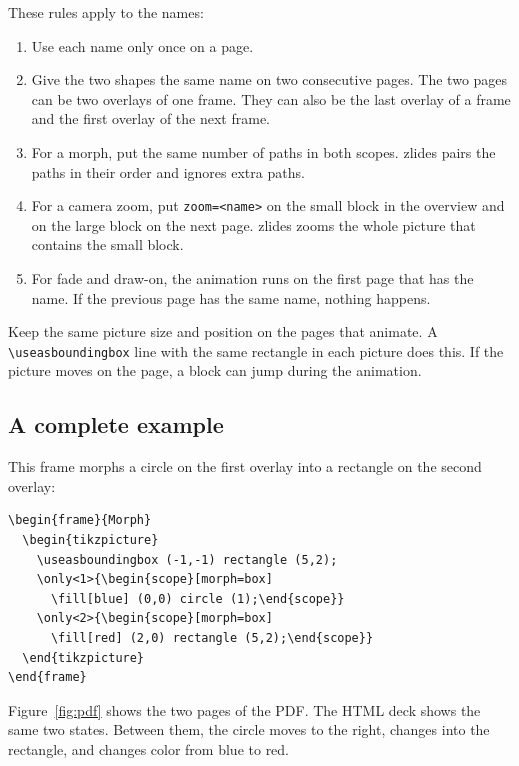 \documentclass[11pt]{article}
\newcommand{\pkg}{\textsf{zlides}}
\newcommand{\cmd}[1]{\texttt{#1}}
\begin{document}
These rules apply to the names:
\begin{enumerate}
	\item Use each name only once on a page.
	\item Give the two shapes the same name on two consecutive pages. The two pages
	      can be two overlays of one frame. They can also be the last overlay of a frame
	      and the first overlay of the next frame.
	\item For a morph, put the same number of paths in both scopes. \pkg{} pairs the
	      paths in their order and ignores extra paths.
	\item For a camera zoom, put \cmd{zoom=<name>} on the small block in the
	      overview and on the large block on the next page. \pkg{} zooms the whole
	      picture that contains the small block.
	\item For fade and draw-on, the animation runs on the first page that has the
	      name. If the previous page has the same name, nothing happens.
\end{enumerate}

Keep the same picture size and position on the pages that animate. A
\cmd{\textbackslash useasboundingbox} line with the same rectangle in each picture
does this. If the picture moves on the page, a block can jump during the
animation.

\subsection{A complete example}

This frame morphs a circle on the first overlay into a rectangle on the second
overlay:
\begin{lstlisting}
\begin{frame}{Morph}
  \begin{tikzpicture}
    \useasboundingbox (-1,-1) rectangle (5,2);
    \only<1>{\begin{scope}[morph=box]
      \fill[blue] (0,0) circle (1);\end{scope}}
    \only<2>{\begin{scope}[morph=box]
      \fill[red] (2,0) rectangle (5,2);\end{scope}}
  \end{tikzpicture}
\end{frame}
\end{lstlisting}
Figure~\ref{fig:pdf} shows the two pages of the PDF. The HTML deck shows the same
two states. Between them, the circle moves to the right, changes into the
rectangle, and changes color from blue to red.
\end{document}
